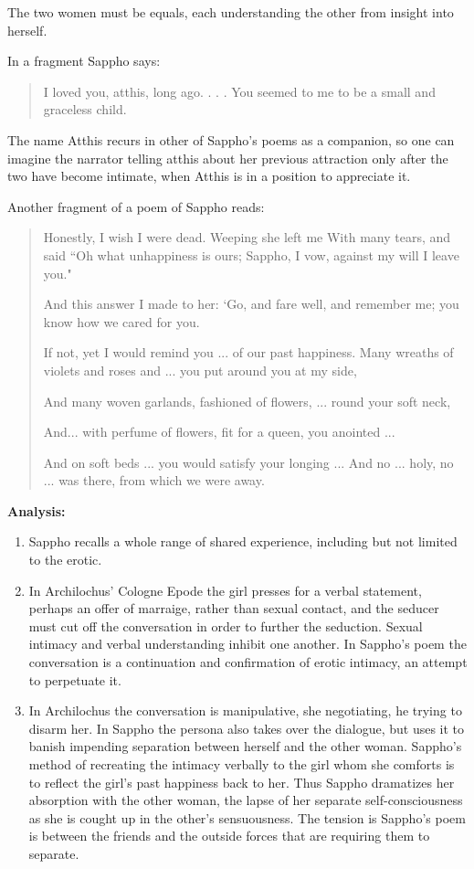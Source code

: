 \begin{rmk}
    The two women must be equals, each understanding the other from insight into herself.
\end{rmk}

In a fragment Sappho says:\begin{quotation}
    I loved you, atthis, long ago. . . . You seemed to me to be a small and graceless child.
\end{quotation}
The name Atthis recurs in other of Sappho's poems as a companion, so one can imagine the narrator telling atthis about her previous attraction only after the two have become intimate, when Atthis is in a position to appreciate it.

Another fragment of a poem of Sappho reads:

\begin{quotation}
    Honestly, I wish I were dead. Weeping she left me With many tears, and said ``Oh what unhappiness is ours; Sappho, I vow, against my will I leave you."

    And this answer I made to her: `Go, and fare well, and remember me; you know how we cared for you.

    If not, yet I would remind you ... of our past happiness. Many wreaths of violets and roses and ... you put around you at my side,

    And many woven garlands, fashioned of flowers, ... round your soft neck,

    And... with perfume of flowers, fit for a queen, you anointed ...
    
    And on soft beds ... you would satisfy your longing ... And no ... holy, no ... was there, from which we were away.
\end{quotation}


\textbf{Analysis:}
\begin{enumerate}
    \item Sappho recalls a whole range of shared experience, including but not limited to the erotic.
    \item In Archilochus' Cologne Epode the girl presses for a verbal statement, perhaps an offer of marraige, rather than sexual contact, and the seducer must cut off the conversation in order to further the seduction. Sexual intimacy and verbal understanding inhibit one another. In Sappho's poem the conversation is a continuation and confirmation of erotic intimacy, an attempt to perpetuate it. 
    \item In Archilochus the conversation is manipulative, she negotiating, he trying to disarm her. In Sappho the persona also  takes over the dialogue, but uses it to banish impending separation between herself and the other woman. Sappho's method of recreating the intimacy verbally to the girl whom she comforts is to reflect the girl's past happiness back to her. Thus Sappho dramatizes her absorption with the other woman, the lapse of her separate self-consciousness as she is cought up in the other's sensuousness. The tension is Sappho's poem is between the friends and the outside forces that are requiring them to separate.
\end{enumerate}

